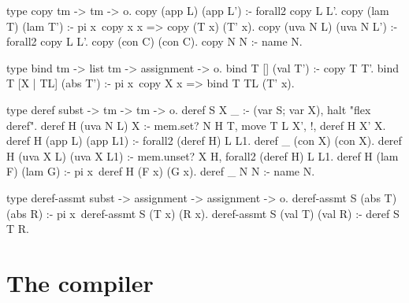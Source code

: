 \begin{elpicode}
  type copy tm -> tm -> o.
  copy (app L)   (app L') :- forall2 copy L L'.
  copy (lam T)   (lam T') :- pi x\ copy x x => copy (T x) (T' x).
  copy (uva N L) (uva N L') :- forall2 copy L L'.
  copy (con C)   (con C).
  copy N N :- name N.

  type bind tm -> list tm -> assignment -> o.
  bind T [] (val T') :- copy T T'.
  bind T [X | TL] (abs T') :- pi x\ copy X x => bind T TL (T' x).

  type deref subst -> tm -> tm -> o.
  deref S X _ :- (var S; var X), halt "flex deref".
  deref H (uva N L)  X         :- mem.set? N H T, 
    move T L X', !, deref H X' X.
  deref H (app L)   (app L1)   :- forall2 (deref H) L L1.
  deref _ (con X)   (con X).
  deref H (uva X L) (uva X L1) :- mem.unset? X H, 
    forall2 (deref H) L L1.
  deref H (lam F)   (lam G)    :- pi x\ deref H (F x) (G x).
  deref _ N         N          :- name N.

  type deref-assmt subst -> assignment -> assignment -> o.
  deref-assmt S (abs T) (abs R) :- pi x\ deref-assmt S (T x) (R x).
  deref-assmt S (val T) (val R) :- deref S T R.
\end{elpicode}
\section{The compiler}

